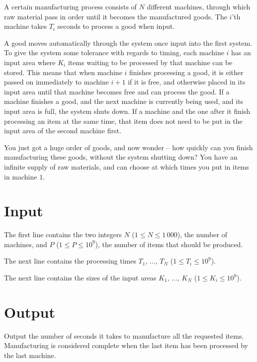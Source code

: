 A certain manufacturing process consists of $N$ different machines, through which raw material pass in order until it becomes the manufactured goods.
The $i$'th machine takes $T_i$ seconds to process a good when input.

A good moves automatically through the system once input into the first system.
To give the system some tolerance with regards to timing, each machine $i$ has an input area where $K_i$ items waiting to be processed by that machine can be stored.
This means that when machine $i$ finishes processing a good, it is either passed on immediately to machine $i + 1$ if it is free, and otherwise placed in its input area until that machine becomes free and can process the good.
If a machine finishes a good, and the next machine is currently being used, and its input area is full, the system shuts down.
If a machine and the one after it finish processing an item at the same time, that item does not need to be put in the input area of the second machine first.

You just got a huge order of goods, and now wonder -- how quickly can you finish manufacturing these goods, without the system shutting down?
You have an infinite supply of raw materials, and can choose at which times you put in items in machine $1$.

\section*{Input}
The first line contains the two integers $N$ ($1 \le N \le 1\,000$), the number of machines, and $P$ ($1 \le P \le 10^9$), the number of items that should be produced.

The next line contains the processing times $T_1$, $\dots$, $T_N$ ($1 \le T_i \le 10^9$).

The next line contains the sizes of the input areas $K_1$, $\dots$, $K_N$ ($1 \le K_i \le 10^9$).

\section*{Output}
Output the number of seconds it takes to manufacture all the requested items.
Manufacturing is considered complete when the last item has been processed by the last machine.
